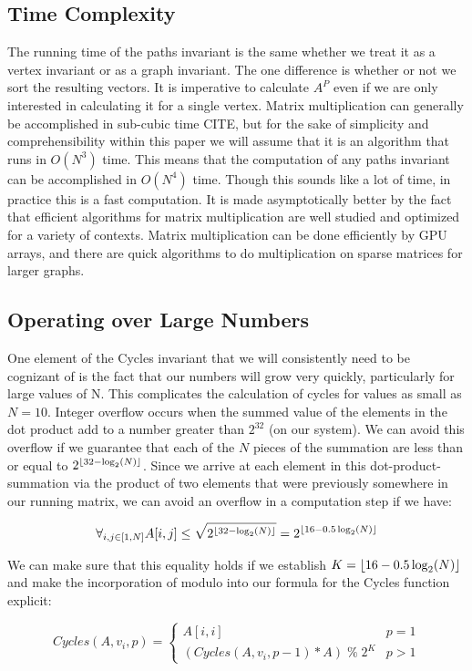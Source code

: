 \subsection{Time Complexity}
The running time of the paths invariant is the same whether we treat it as a vertex invariant or as a graph invariant.
The one difference is whether or not we sort the resulting vectors.
It is imperative to calculate $A^P$ even if we are only interested in calculating it for a single vertex.
Matrix multiplication can generally be accomplished in sub-cubic time CITE, but for the sake of simplicity and comprehensibility within this paper we will assume that it is an algorithm that runs in $O(N^3)$  time.
This means that the computation of any paths invariant can be accomplished in $O(N^4)$ time.
Though this sounds like a lot of time, in practice this is a fast computation.
It is made asymptotically better by the fact that efficient algorithms for matrix multiplication are well studied and optimized for a variety of contexts.
Matrix multiplication can be done efficiently by GPU arrays, and there are quick algorithms to do multiplication on sparse matrices for larger graphs.


\subsection{Operating over Large Numbers}
One element of the Cycles invariant that we will consistently need to be cognizant of is the fact that our numbers will grow very quickly, particularly for large values of N.
This complicates the calculation of cycles for values as small as $N=10$.
Integer overflow occurs when the summed value of the elements in the dot product add to a number greater than $2^{32}$ (on our system).
We can avoid this overflow if we guarantee that each of the $N$ pieces of the summation are less than or equal to $2^{\lfloor32 - \log_2(N)\rfloor}$.
Since we arrive at each element in this dot-product-summation via the product of two elements that were previously somewhere in our running matrix, we can avoid an overflow in a computation step if we have:

$$ \forall_{i, j \in [1, N]} A[i, j] \leq \sqrt{2^{\lfloor32 - \log_2(N)\rfloor}} = 2^{\lfloor16 - 0.5\log_2(N)\rfloor}$$

We can make sure that this equality holds if we establish $K = \lfloor16 - 0.5\log_2(N)\rfloor$ and make the incorporation of modulo into our formula for the Cycles function explicit:

$$ Cycles(A, v_i, p) = \begin{cases} 
      A[i,i] & p = 1 \\
      (Cycles(A, v_i, p-1) * A) \; \% \; 2^K  & p > 1
\end{cases}$$


